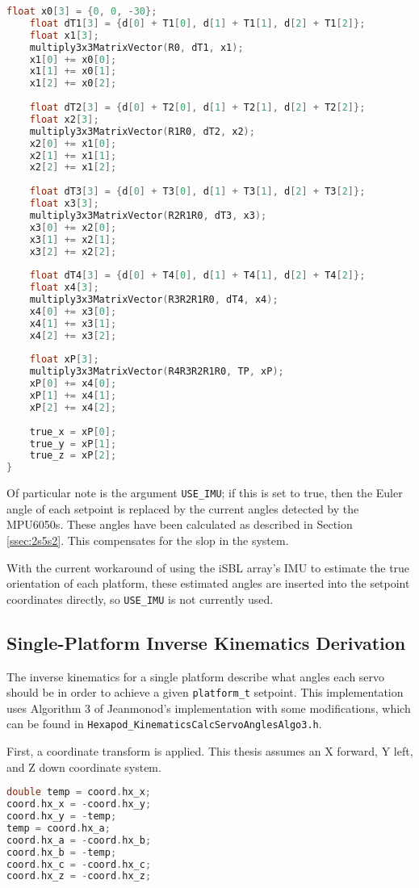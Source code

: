 \documentclass[12pt,a4paper]{report}
\begin{document}
\begin{lstlisting}[language=C++]
	float x0[3] = {0, 0, -30};
	float dT1[3] = {d[0] + T1[0], d[1] + T1[1], d[2] + T1[2]};
	float x1[3];
	multiply3x3MatrixVector(R0, dT1, x1);
	x1[0] += x0[0];
	x1[1] += x0[1];
	x1[2] += x0[2];
	
	float dT2[3] = {d[0] + T2[0], d[1] + T2[1], d[2] + T2[2]};
	float x2[3];
	multiply3x3MatrixVector(R1R0, dT2, x2);
	x2[0] += x1[0];
	x2[1] += x1[1];
	x2[2] += x1[2];
	
	float dT3[3] = {d[0] + T3[0], d[1] + T3[1], d[2] + T3[2]};
	float x3[3];
	multiply3x3MatrixVector(R2R1R0, dT3, x3);
	x3[0] += x2[0];
	x3[1] += x2[1];
	x3[2] += x2[2];
	
	float dT4[3] = {d[0] + T4[0], d[1] + T4[1], d[2] + T4[2]};
	float x4[3];
	multiply3x3MatrixVector(R3R2R1R0, dT4, x4);
	x4[0] += x3[0];
	x4[1] += x3[1];
	x4[2] += x3[2];
	
	float xP[3];
	multiply3x3MatrixVector(R4R3R2R1R0, TP, xP);
	xP[0] += x4[0];
	xP[1] += x4[1];
	xP[2] += x4[2];
	
	true_x = xP[0];
	true_y = xP[1];
	true_z = xP[2];
}
\end{lstlisting}

Of particular note is the argument \verb|USE_IMU|; if this is set to true, then the Euler angle of each setpoint is replaced by the current angles detected by the MPU6050s. These angles have been calculated as described in Section \ref{ssec:2s5s2}. This compensates for the slop in the system. 

With the current workaround of using the iSBL array’s IMU to estimate the true orientation of each platform, these estimated angles are inserted into the setpoint coordinates directly, so \verb|USE_IMU| is not currently used.

\subsection{Single-Platform Inverse Kinematics Derivation} \label{ssec:2s5s5}
The inverse kinematics for a single platform describe what angles each servo should be in order to achieve a given \verb|platform_t| setpoint. This implementation uses Algorithm 3 of Jeanmonod’s implementation \cite{nichub} with some modifications, which can be found in \verb|Hexapod_KinematicsCalcServoAnglesAlgo3.h|.

First, a coordinate transform is applied. This thesis assumes an X forward, Y left, and Z down coordinate system.

\begin{lstlisting}[language=C++]
double temp = coord.hx_x;
coord.hx_x = -coord.hx_y;
coord.hx_y = -temp;
temp = coord.hx_a;
coord.hx_a = -coord.hx_b;
coord.hx_b = -temp;
coord.hx_c = -coord.hx_c;
coord.hx_z = -coord.hx_z;
\end{lstlisting}
\end{document}

